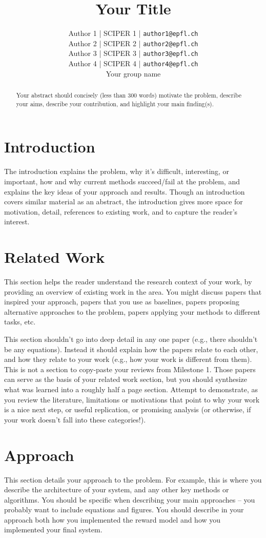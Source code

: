 \documentclass[11pt]{article}
\title{Your Title}
\author{\normalfont 
Author 1 | SCIPER 1 | \texttt{author1@epfl.ch} \\
Author 2 | SCIPER 2 | \texttt{author2@epfl.ch} \\
Author 3 | SCIPER 3 | \texttt{author3@epfl.ch} \\
Author 4 | SCIPER 4 | \texttt{author4@epfl.ch} \\
Your group name
}
\begin{document}
\maketitle
\begin{abstract}
Your abstract should concisely (less than 300 words) motivate the problem, describe your aims, describe your contribution, and highlight your main finding(s).
\end{abstract}

\section{Introduction}
The introduction explains the problem, why it’s difficult, interesting, or important, how and why current methods succeed/fail at the problem, and explains the key ideas of your approach and results. Though an introduction covers similar material as an abstract, the introduction gives more space for motivation, detail, references to existing work, and to capture the reader’s interest.

\section{Related Work}
This section helps the reader understand the research context of your work, by providing an overview of existing work in the area. You might discuss papers that inspired your approach, papers that you use as baselines, papers proposing alternative approaches to the problem, papers applying your methods to different tasks, etc.

This section shouldn’t go into deep detail in any one paper (e.g., there shouldn’t be any equations). Instead it should explain how the papers relate to each other, and how they relate to your work (e.g., how your work is different from them). This is not a section to copy-paste your reviews from Milestone 1. Those papers can serve as the basis of your related work section, but you should synthesize what was learned into a roughly half a page section.  Attempt to demonstrate, as you review the literature, limitations or motivations that point to why your work is a nice next step, or useful replication, or promising analysis (or otherwise, if your work doesn’t fall into these categories!).


\section{Approach}
This section details your approach to the problem. For example, this is where you describe the architecture of your system, and any other key methods or algorithms. You should be specific when describing your main approaches – you probably want to include equations and figures. You should describe in your approach both how you implemented the reward model and how you implemented your final system.
\end{document}
